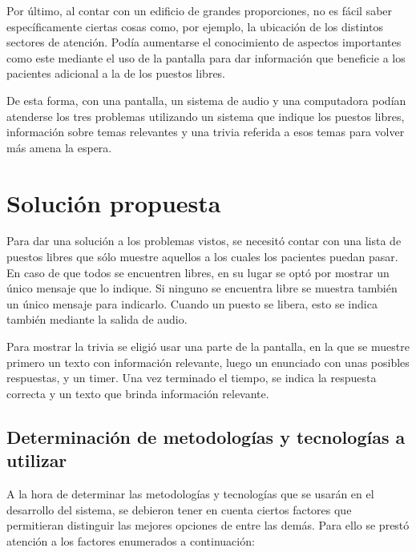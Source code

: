 \documentclass{article}
\begin{document}
Por último, al contar con un edificio de grandes proporciones, no es fácil saber específicamente ciertas cosas como, por ejemplo, la ubicación de los distintos sectores de atención. Podía aumentarse el conocimiento de aspectos importantes como este mediante el uso de la pantalla para dar información que beneficie a los pacientes adicional a la de los puestos libres.

De esta forma, con una pantalla, un sistema de audio y una computadora podían atenderse los tres problemas utilizando un sistema que indique los puestos libres, información sobre temas relevantes y una trivia referida a esos temas para volver más amena la espera.
\newpage
\section{Solución propuesta}
Para dar una solución a los problemas vistos, se necesitó contar con una lista de puestos libres que sólo muestre aquellos a los cuales los pacientes puedan pasar. En caso de que todos se encuentren libres, en su lugar se optó por mostrar un único mensaje que lo indique. Si ninguno se encuentra libre se muestra también un único mensaje para indicarlo. Cuando un puesto se libera, esto se indica también mediante la salida de audio.

Para mostrar la trivia se eligió usar una parte de la pantalla, en la que se muestre primero un texto con información relevante, luego un enunciado con unas posibles respuestas, y un timer. Una vez terminado el tiempo, se indica la respuesta correcta y un texto que brinda información relevante.
\newpage
\subsection{Determinación de metodologías y tecnologías a utilizar}
A la hora de determinar las metodologías y tecnologías que se usarán en el desarrollo del sistema, se debieron tener en cuenta ciertos factores que permitieran distinguir las mejores opciones de entre las demás. Para ello se prestó atención a los factores enumerados a continuación:
\end{document}
